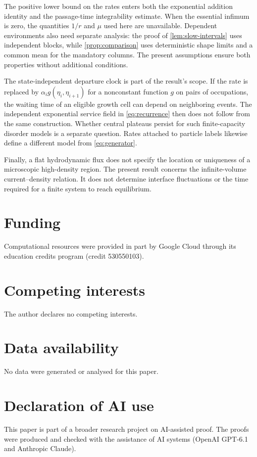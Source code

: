 \documentclass[11pt]{amsart}
\theoremstyle{remark}
\numberwithin{equation}{section}
\begin{document}
The positive lower bound on the rates enters both the exponential
addition identity and the passage-time integrability estimate. When
the essential infimum is zero, the quantities $1/r$ and $\mu$ used
here are unavailable. Dependent environments also need separate
analysis: the proof of \cref{lem:slow-intervals} uses independent
blocks, while \cref{prop:comparison} uses deterministic shape limits
and a common mean for the mandatory columns. The present assumptions
ensure both properties without additional conditions.

The state-independent departure clock is part of the result's scope.
If the rate is replaced by $\alpha_i g(\eta_i,\eta_{i+1})$ for a
nonconstant function $g$ on pairs of occupations, the waiting time of
an eligible growth cell can depend on neighboring events. The
independent exponential service field in \eqref{eq:recurrence} then
does not follow from the same construction. Whether central plateaus
persist for such finite-capacity disorder models is a separate
question. Rates attached to particle labels likewise define a
different model from \eqref{eq:generator}.

Finally, a flat hydrodynamic flux does not specify the location or
uniqueness of a microscopic high-density region. The present result
concerns the infinite-volume current--density relation. It does not
determine interface fluctuations or the time required for a finite
system to reach equilibrium.

\section*{Funding}
Computational resources were provided in part by Google Cloud through its
education credits program (credit 530550103).

\section*{Competing interests}
The author declares no competing interests.

\section*{Data availability}
No data were generated or analysed for this paper.

\section*{Declaration of AI use}
This paper is part of a broader research project on AI-assisted proof. The proofs were produced and checked with the
assistance of AI systems (OpenAI GPT-6.1 and Anthropic Claude).
\end{document}
